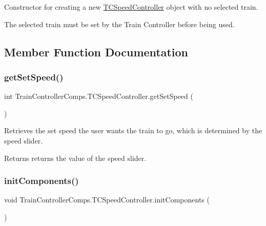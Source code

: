 Constructor for creating a new \hyperlink{classTrainControllerComps_1_1TCSpeedController}{T\+C\+Speed\+Controller} object with no selected train. 

The selected train must be set by the Train Controller before being used. 

\subsection{Member Function Documentation}
\mbox{\label{classTrainControllerComps_1_1TCSpeedController_a46ca9df1d707cecd4167a532babcf6ed}} 
\subsubsection{\texorpdfstring{get\+Set\+Speed()}{getSetSpeed()}}
{\footnotesize\ttfamily int Train\+Controller\+Comps.\+T\+C\+Speed\+Controller.\+get\+Set\+Speed (\begin{DoxyParamCaption}{ }\end{DoxyParamCaption})}



Retrieves the set speed the user wants the train to go, which is determined by the speed slider. 

\begin{DoxyReturn}{Returns}
returns the value of the speed slider. 
\end{DoxyReturn}
\mbox{\label{classTrainControllerComps_1_1TCSpeedController_a2b6b810eeb4e36a5932b6c26babfd7a2}} 
\subsubsection{\texorpdfstring{init\+Components()}{initComponents()}}
{\footnotesize\ttfamily void Train\+Controller\+Comps.\+T\+C\+Speed\+Controller.\+init\+Components (\begin{DoxyParamCaption}{ }\end{DoxyParamCaption})\hspace{0.3cm}{\ttfamily [private]}}




